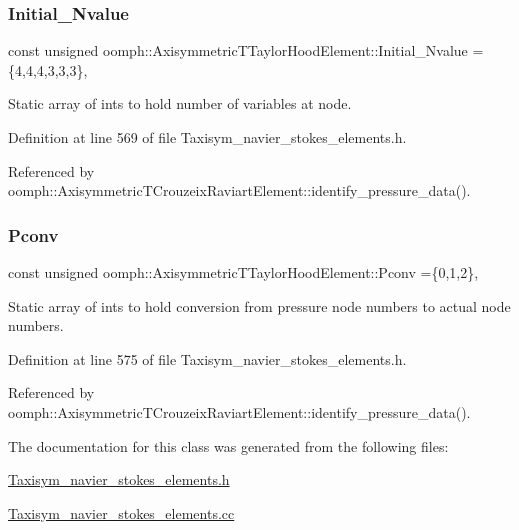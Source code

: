 \subsubsection{\texorpdfstring{Initial\+\_\+\+Nvalue}{Initial\_Nvalue}}
{\footnotesize\ttfamily const unsigned oomph\+::\+Axisymmetric\+T\+Taylor\+Hood\+Element\+::\+Initial\+\_\+\+Nvalue =\{4,4,4,3,3,3\}\hspace{0.3cm}{\ttfamily [static]}, {\ttfamily [private]}}



Static array of ints to hold number of variables at node. 



Definition at line 569 of file Taxisym\+\_\+navier\+\_\+stokes\+\_\+elements.\+h.



Referenced by oomph\+::\+Axisymmetric\+T\+Crouzeix\+Raviart\+Element\+::identify\+\_\+pressure\+\_\+data().

\mbox{\label{classoomph_1_1AxisymmetricTTaylorHoodElement_a0aeec7081602d00fd711fd9d0b2022b9}} 
\subsubsection{\texorpdfstring{Pconv}{Pconv}}
{\footnotesize\ttfamily const unsigned oomph\+::\+Axisymmetric\+T\+Taylor\+Hood\+Element\+::\+Pconv =\{0,1,2\}\hspace{0.3cm}{\ttfamily [static]}, {\ttfamily [protected]}}



Static array of ints to hold conversion from pressure node numbers to actual node numbers. 



Definition at line 575 of file Taxisym\+\_\+navier\+\_\+stokes\+\_\+elements.\+h.



Referenced by oomph\+::\+Axisymmetric\+T\+Crouzeix\+Raviart\+Element\+::identify\+\_\+pressure\+\_\+data().



The documentation for this class was generated from the following files\+:\begin{DoxyCompactItemize}
\item 
\hyperlink{Taxisym__navier__stokes__elements_8h}{Taxisym\+\_\+navier\+\_\+stokes\+\_\+elements.\+h}\item 
\hyperlink{Taxisym__navier__stokes__elements_8cc}{Taxisym\+\_\+navier\+\_\+stokes\+\_\+elements.\+cc}\end{DoxyCompactItemize}
